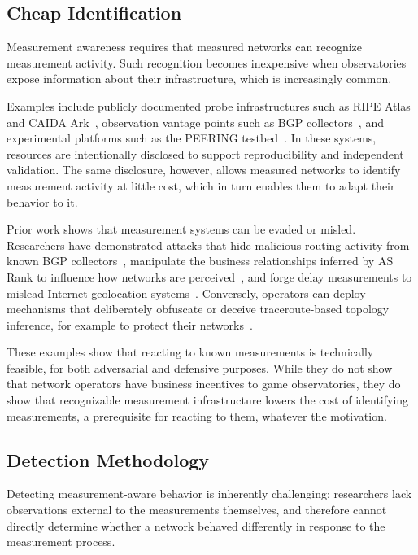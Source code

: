 \documentclass[sigconf, 10pt]{acmart}
\begin{document}
\subsection{Cheap Identification}

Measurement awareness requires that measured networks can recognize measurement activity. Such recognition becomes inexpensive when observatories expose information about their infrastructure, which is increasingly common. 

Examples include publicly documented probe infrastructures such as RIPE Atlas and CAIDA Ark~\cite{ripeatlas,caida_ark}, observation vantage points such as BGP collectors~\cite{ripe_ris,routeviews}, and experimental platforms such as the PEERING testbed~\cite{peering}. In these systems, resources are intentionally disclosed to support reproducibility and independent validation. The same disclosure, however, allows measured networks to identify measurement activity at little cost, which in turn enables them to adapt their behavior to it.

Prior work shows that measurement systems can be evaded or misled. Researchers have demonstrated attacks that hide malicious routing activity from known BGP collectors~\cite{global_bgp_attacks,sico}, manipulate the business relationships inferred by AS Rank to influence how networks are perceived~\cite{asrogue}, and forge delay measurements to mislead Internet geolocation systems~\cite{geolocation}. Conversely, operators can deploy mechanisms that deliberately obfuscate or deceive traceroute-based topology inference, for example to protect their networks~\cite{nethide,topologydeception}. 

These examples show that reacting to known measurements is technically feasible, for both adversarial and defensive purposes. While they do not show that network operators have business incentives to game observatories, they do show that recognizable measurement infrastructure lowers the cost of identifying measurements, a prerequisite for reacting to them, whatever the motivation.

\subsection{Detection Methodology}
\label{sec:methodology}
Detecting measurement-aware behavior is inherently challenging: researchers lack observations external to the measurements themselves, and therefore cannot directly determine whether a network behaved differently in response to the measurement process. 
\end{document}
